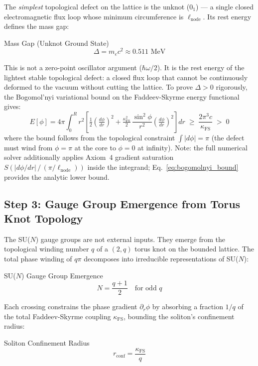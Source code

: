 The \textit{simplest} topological defect on the lattice is the unknot ($0_1$) --- a single closed electromagnetic flux loop whose minimum circumference is $\ell_\mathrm{node}$. Its rest energy defines the mass gap:
\begin{resultbox}{Mass Gap (Unknot Ground State)}
\begin{equation}
    \Delta = m_e c^2 \approx 0.511 \text{ MeV}
\end{equation}
\end{resultbox}
This is not a zero-point oscillator argument ($\hbar\omega/2$). It is the rest energy of the lightest stable topological defect: a closed flux loop that cannot be continuously deformed to the vacuum without cutting the lattice. To prove $\Delta > 0$ rigorously, the Bogomol'nyi variational bound on the Faddeev-Skyrme energy functional gives:
\begin{equation}
    E[\phi] = 4\pi\!\int_0^{R}\! r^2 \left[
    \tfrac{1}{2}\left(\tfrac{d\phi}{dr}\right)^{2}
    + \tfrac{\kappa_\mathrm{FS}^2}{2}\,\frac{\sin^2\!\phi}{r^2}
    \left(\tfrac{d\phi}{dr}\right)^{2}
    \right] dr
    \;\geq\; \frac{2\pi^3 c}{\kappa_\mathrm{FS}} \;>\; 0
    \label{eq:bogomolnyi_bound}
\end{equation}
where the bound follows from the topological constraint $\int |d\phi| = \pi$ (the defect must wind from $\phi = \pi$ at the core to $\phi = 0$ at infinity). Note: the full numerical solver additionally applies Axiom~4 gradient saturation $S(|d\phi/dr|\,/\,(\pi/\ell_\mathrm{node}))$ inside the integrand; Eq.~\eqref{eq:bogomolnyi_bound} provides the analytic lower bound.

\subsection{Step 3: Gauge Group Emergence from Torus Knot Topology}

The SU($N$) gauge groups are not external inputs. They emerge from the topological winding number $q$ of a $(2,q)$ torus knot on the bounded lattice. The total phase winding of $q\pi$ decomposes into irreducible representations of SU($N$):
\begin{resultbox}{SU($N$) Gauge Group Emergence}
\begin{equation}
    N = \frac{q+1}{2} \quad\text{for odd } q
    \label{eq:gauge_rank}
\end{equation}
\end{resultbox}
Each crossing constrains the phase gradient $\partial_r\phi$ by absorbing a fraction $1/q$ of the total Faddeev-Skyrme coupling $\kappa_\mathrm{FS}$, bounding the soliton's confinement radius:
\begin{resultbox}{Soliton Confinement Radius}
\begin{equation}
    r_\mathrm{conf} = \frac{\kappa_\mathrm{FS}}{q}
    \label{eq:confinement_radius}
\end{equation}
\end{resultbox}


